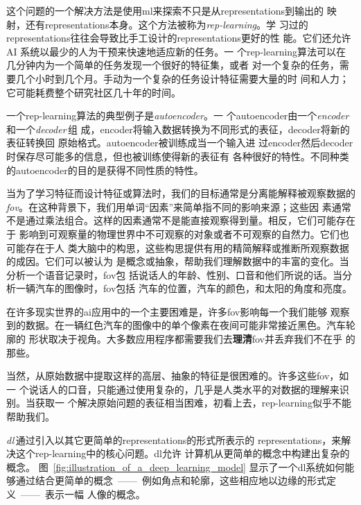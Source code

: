这个问题的一个解决方法是使用\gls*{ml}来探索不只是从\gls*{representations}到输出的
映射，还有\gls*{representations}本身。这个方法被称为\emph{\gls{rep-learning}}。学
习过的\gls*{representations}往往会导致比手工设计的\gls*{representations}更好的性
能。它们还允许 AI 系统以最少的人为干预来快速地适应新的任务。一
个\gls*{rep-learning}算法可以在几分钟内为一个简单的任务发现一个很好的特征集，或者
对一个复杂的任务，需要几个小时到几个月。手动为一个复杂的任务设计特征需要大量的时
间和人力；它可能耗费整个研究社区几十年的时间。

一个\gls*{rep-learning}算法的典型例子是\emph{\gls{autoencoder}}。一
个\gls*{autoencoder}由一个\emph{\gls{encoder}}\,和一个\emph{\gls{decoder}}\,组
成，\gls*{encoder}将输入数据转换为不同形式的表征，\gls*{decoder}将新的表征转换回
原始格式。\gls*{autoencoder}被训练成当一个输入进
过\gls*{encoder}然后\gls*{decoder}时保存尽可能多的信息，但也被训练使得新的表征有
各种很好的特性。不同种类的\gls*{autoencoder}的目的是获得不同性质的特性。

当为了学习特征而设计特征或算法时，我们的目标通常是分离能解释被观察数据的%
\emph{\gls{fov}}。在这种背景下，我们用单词``因素''来简单指不同的影响来源；这些因
素通常不是通过乘法组合。这样的因素通常不是能直接观察得到量。相反，它们可能存在于
影响到可观察量的物理世界中不可观察的对象或者不可观察的自然力。它们也可能存在于人
类大脑中的构思，这些构思提供有用的精简解释或推断所观察数据的成因。它们可以被认为
是概念或抽象，帮助我们理解数据中的丰富的变化。当分析一个语音记录时，\gls*{fov}包
括说话人的年龄、性别、口音和他们所说的话。当分析一辆汽车的图像时，\gls*{fov}包括
汽车的位置，汽车的颜色，和太阳的角度和亮度。

在许多现实世界的\gls*{ai}应用中的一个主要困难是，许多\gls*{fov}影响每一个我们能够
观察到的数据。在一辆红色汽车的图像中的单个像素在夜间可能非常接近黑色。汽车轮廓的
形状取决于视角。大多数应用程序都需要我们去\textbf{理清}\gls*{fov}并丢弃我们不在乎
的那些。

当然，从原始数据中提取这样的高层、抽象的特征是很困难的。许多这些\gls*{fov}，如一
个说话人的口音，只能通过使用复杂的，几乎是人类水平的对数据的理解来识别。当获取一
个解决原始问题的表征相当困难，初看上去，\gls*{rep-learning}似乎不能帮助我们。

\emph{\gls{dl}}\,通过引入以其它更简单的\gls*{representations}的形式所表示的%
\gls*{representations}，来解决这个\gls*{rep-learning}中的核心问题。\gls*{dl}允许
计算机从更简单的概念中构建出复杂的概念。
图~\ref{fig:illustration_of_a_deep_learning_model} 显示了一个\gls*{dl}系统如何能
够通过结合更简单的概念~——~例如角点和轮廓，这些相应地以边缘的形式定义~——~表示一幅
人像的概念。

